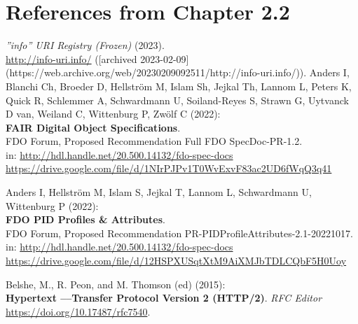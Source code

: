 
\section{References from Chapter 2.2}

\emph{”info” URI Registry (Frozen)} (2023).  \\
\url{http://info-uri.info/} ([archived 2023-02-09](https://web.archive.org/web/20230209092511/http://info-uri.info/)).
{}
Anders I, Blanchi Ch, Broeder D, Hellström M, Islam Sh, Jejkal Th, Lannom L, Peters K, Quick R, Schlemmer A, Schwardmann U, Soiland-Reyes S, Strawn G, Uytvanck D van, Weiland C, Wittenburg P, Zwölf C (2022):\\
\textbf{FAIR Digital Object Specifications}.\\
FDO Forum, Proposed Recommendation Full FDO SpecDoc-PR-1.2. \\
in: \url{http://hdl.handle.net/20.500.14132/fdo-spec-docs}\\
\url{https://drive.google.com/file/d/1NIrPJPv1T0WvExvF83ac2UD6fWqQ3q41}

Anders I, Hellström M, Islam S, Jejkal T, Lannom L, Schwardmann U, Wittenburg P (2022):\\
\textbf{FDO PID Profiles \& Attributes}.\\
FDO Forum,  Proposed Recommendation PR-PIDProfileAttributes-2.1-20221017.
in: \url{http://hdl.handle.net/20.500.14132/fdo-spec-docs}\\
\url{https://drive.google.com/file/d/12HSPXUSqtXtM9AiXMJbTDLCQbF5H0Uoy}


Belshe, M., R. Peon, and M. Thomson (ed) (2015):\\
\textbf{Hypertext ––Transfer Protocol Version 2 (HTTP/2)}. 
\emph{RFC Editor}
\url{https://doi.org/10.17487/rfc7540}.

